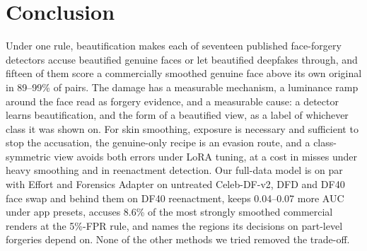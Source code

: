 \documentclass[conference]{IEEEtran}
\begin{document}
\section{Conclusion}
Under one rule, beautification makes each of seventeen published face-forgery detectors accuse beautified genuine faces
or let beautified deepfakes through, and fifteen of them score a commercially smoothed genuine face above its own
original in 89--99\% of pairs. The damage has a measurable mechanism, a luminance ramp around the face read as forgery
evidence, and a measurable cause: a detector learns beautification, and the form of a beautified view, as a label of
whichever class it was shown on. For skin smoothing, exposure is necessary and sufficient to stop the accusation, the
genuine-only recipe is an evasion route, and a class-symmetric view avoids both errors under LoRA tuning, at a cost in
misses under heavy smoothing and in reenactment detection. Our full-data model is on par with Effort and Forensics
Adapter on untreated Celeb-DF-v2, DFD and DF40 face swap and behind them on DF40 reenactment, keeps 0.04--0.07 more
AUC under app presets, accuses 8.6\% of the most strongly smoothed commercial renders at the 5\%-FPR rule, and names
the regions its decisions on part-level forgeries depend on. None of the other methods we tried removed the trade-off.



\end{document}

